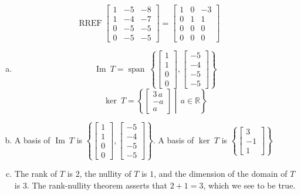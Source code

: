 \begin{exerciseAnswer} 


\[\operatorname{RREF} \left[\begin{array}{ccc}
1 & -5 & -8 \\
1 & -4 & -7 \\
0 & -5 & -5 \\
0 & -5 & -5
\end{array}\right] = \left[\begin{array}{ccc}
1 & 0 & -3 \\
0 & 1 & 1 \\
0 & 0 & 0 \\
0 & 0 & 0
\end{array}\right] \]


\begin{enumerate}[(a)]
\item \[\operatorname{Im}\ T = \operatorname{span}\  \left\{ \left[\begin{array}{c}
1 \\
1 \\
0 \\
0
\end{array}\right] , \left[\begin{array}{c}
-5 \\
-4 \\
-5 \\
-5
\end{array}\right] \right\} \]\[\operatorname{ker}\ T =  \left\{ \left[\begin{array}{c}
3 \, a \\
-a \\
a
\end{array}\right] \middle|\,a\in\mathbb{R}\right\} \]
\item  A basis of \(\operatorname{Im}\ T\) is \( \left\{ \left[\begin{array}{c}
1 \\
1 \\
0 \\
0
\end{array}\right] , \left[\begin{array}{c}
-5 \\
-4 \\
-5 \\
-5
\end{array}\right] \right\} \). A basis of \(\operatorname{ker}\ T\) is \( \left\{ \left[\begin{array}{c}
3 \\
-1 \\
1
\end{array}\right] \right\} \)
\item  The rank of \(T\) is \( 2 \), the nullity of \(T\) is \( 1 \), and the dimension of the domain of \(T\) is \( 3 \). The rank-nullity theorem asserts that \( 2 + 1 = 3 \), which we see to be true. 
\end{enumerate}
    
\end{exerciseAnswer}
    
